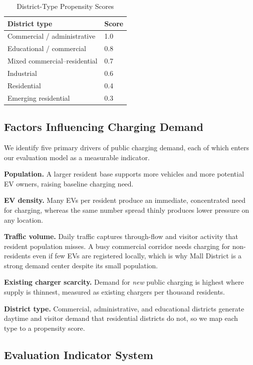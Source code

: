 \documentclass[12pt]{article}
\begin{document}
\begin{table}[H]
\centering
\caption{District-Type Propensity Scores}
\label{tab:typescore}
\renewcommand{\arraystretch}{0.95}
\begin{tabular}{@{}p{}p{}@{}}
\toprule
District type & Score \\
\midrule
Commercial / administrative & 1.0 \\
Educational / commercial & 0.8 \\
Mixed commercial--residential & 0.7 \\
Industrial & 0.6 \\
Residential & 0.4 \\
Emerging residential & 0.3 \\
\bottomrule
\end{tabular}
\end{table}

\subsection{Factors Influencing Charging Demand}

We identify five primary drivers of public charging demand, each of which enters our
evaluation model as a measurable indicator.

\textbf{Population.} A larger resident base supports more vehicles and more potential EV
owners, raising baseline charging need.

\textbf{EV density.} Many EVs per resident produce an immediate, concentrated need for
charging, whereas the same number spread thinly produces lower pressure on any location.

\textbf{Traffic volume.} Daily traffic captures through-flow and visitor activity that
resident population misses. A busy commercial corridor needs charging for non-residents
even if few EVs are registered locally, which is why Mall District is a strong demand
center despite its small population.

\textbf{Existing charger scarcity.} Demand for \emph{new} public charging is highest where
supply is thinnest, measured as existing chargers per thousand residents.

\textbf{District type.} Commercial, administrative, and educational districts generate
daytime and visitor demand that residential districts do not, so we map each type to a
propensity score.

\subsection{Evaluation Indicator System}
\end{document}

